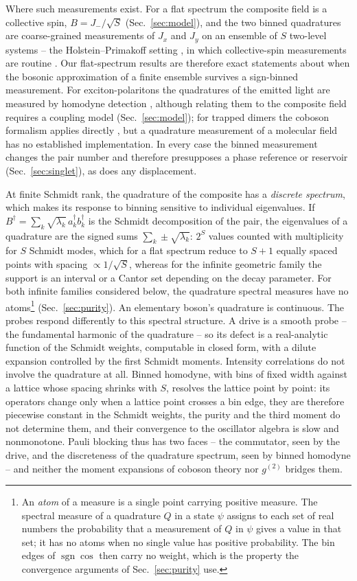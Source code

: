 \documentclass[11pt,a4paper]{article}
\newcommand{\sgn}{\operatorname{sgn}}
\begin{document}
Where such measurements exist. For a flat spectrum the composite field is a collective spin, $B=J_-/\sqrt S$ (Sec.~\ref{sec:model}), and the two binned quadratures are coarse-grained measurements of $J_x$ and $J_y$ on an ensemble of $S$ two-level systems -- the Holstein--Primakoff setting \cite{HolsteinPrimakoff1940}, in which collective-spin measurements are routine \cite{Ma2011}. Our flat-spectrum results are therefore exact statements about when the bosonic approximation of a finite ensemble survives a sign-binned measurement. For exciton-polaritons the quadratures of the emitted light are measured by homodyne detection \cite{Deng2010}, although relating them to the composite field requires a coupling model (Sec.~\ref{sec:model}); for trapped dimers the coboson formalism applies directly \cite{Jimenez2023}, but a quadrature measurement of a molecular field has no established implementation. In every case the binned measurement changes the pair number and therefore presupposes a phase reference or reservoir (Sec.~\ref{sec:singlet}), as does any displacement.

At finite Schmidt rank, the quadrature of the composite has a \emph{discrete spectrum}, which makes its response to binning sensitive to individual eigenvalues. If $B^\dagger=\sum_k\sqrt{\lambda_k}\,a_k^\dagger b_k^\dagger$ is the Schmidt decomposition of the pair, the eigenvalues of a quadrature are the signed sums $\sum_k\pm\sqrt{\lambda_k}$: $2^S$ values counted with multiplicity for $S$ Schmidt modes, which for a flat spectrum reduce to $S+1$ equally spaced points with spacing $\propto1/\sqrt S$, whereas for the infinite geometric family the support is an interval or a Cantor set depending on the decay parameter. For both infinite families considered below, the quadrature spectral measures have no atoms\footnote{An \emph{atom} of a measure is a single point carrying positive measure. The spectral measure of a quadrature $Q$ in a state $\psi$ assigns to each set of real numbers the probability that a measurement of $Q$ in $\psi$ gives a value in that set; it has no atoms when no single value has positive probability. The bin edges of $\sgn\cos$ then carry no weight, which is the property the convergence arguments of Sec.~\ref{sec:purity} use.} (Sec.~\ref{sec:purity}). An elementary boson's quadrature is continuous. The probes respond differently to this spectral structure. A drive is a smooth probe -- the fundamental harmonic of the quadrature -- so its defect is a real-analytic function of the Schmidt weights, computable in closed form, with a dilute expansion controlled by the first Schmidt moments. Intensity correlations do not involve the quadrature at all. Binned homodyne, with bins of fixed width against a lattice whose spacing shrinks with $S$, resolves the lattice point by point: its operators change only when a lattice point crosses a bin edge, they are therefore piecewise constant in the Schmidt weights, the purity and the third moment do not determine them, and their convergence to the oscillator algebra is slow and nonmonotone. Pauli blocking thus has two faces -- the commutator, seen by the drive, and the discreteness of the quadrature spectrum, seen by binned homodyne -- and neither the moment expansions of coboson theory nor $g^{(2)}$ bridges them.
\end{document}
